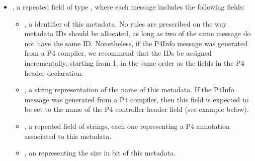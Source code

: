 \documentclass[11pt]{article}
\begin{document}
{\begin{itemize}
\item{}
, a repeated field of type , where each  message
includes the following fields:%

\begin{itemize}[noitemsep,topsep=\mdcompacttopsep]%

\item{}, a  identifier of this metadata. No rules are prescribed on
the way metadata IDs should be allocated, as long as two  of the
same  message do not have the same
ID. Nonetheless, if the P4Info message was generated from a P4 compiler,
we recommend that the IDs be assigned incrementally, starting from 1, in
the same order as the fields in the P4 header declaration.%

\item{}, a string representation of the name of this metadata. If the
P4Info message was generated from a P4 compiler, then this field is
expected to be set to the name of the P4 controller header field (see
example below).%

\item{}, a repeated field of strings, each one representing a P4
annotation associated to this metadata.%

\item{}, an  representing the size in bit of this metadata.%
\end{itemize}%
\end{itemize}%

}
\end{document}
